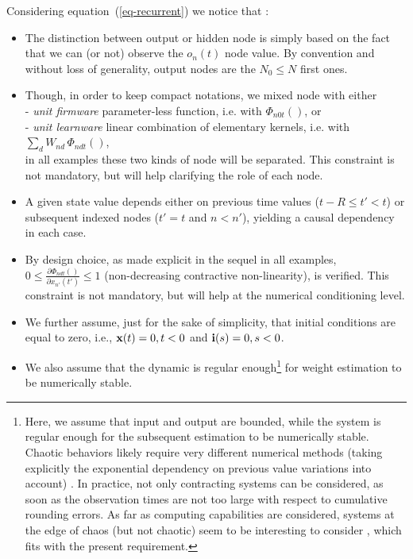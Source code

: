 Considering equation~(\ref{eq-recurrent}) we notice that : \begin{itemize}

\item The distinction between output or hidden node is simply based on the fact that we can (or not) observe the $o_n(t)$ node value. By convention and without loss of generality, output nodes are the $N_0 \leq N$ first ones.

\item Though, in order to keep compact notations, we mixed node with either 
 \\ \hphantom{0.2cm} - {\em unit firmware} parameter-less function, i.e. with $\Phi_{n0t}()$, or
 \\ \hphantom{0.2cm} - {\em unit learnware} linear combination of elementary kernels, i.e. with $\sum_{d} W_{nd} \, \Phi_{ndt}()$,
\\ in all examples these two kinds of node will be separated. This constraint is not mandatory, but will help clarifying the role of each node.

\item A given state value depends either on previous time values ($t - R \leq t' < t$) or subsequent indexed nodes ($t' = t$ and $n < n'$), yielding a causal dependency in each case.

\item By design choice, as made explicit in the sequel in all examples, $0 \leq \frac{\partial \Phi_{ndt}()}{\partial x_{n'}(t')} \leq 1$ (non-decreasing contractive non-linearity), is verified. This constraint is not mandatory, but will help at the numerical conditioning level.

\item We further assume, just for the sake of simplicity, that initial conditions are equal to zero, i.e., ${\bf x}(t) = 0, t < 0$ and ${\bf i}(s) = 0, s < 0$. 

\item We also assume that the dynamic is regular enough\footnote{Here, we assume that input and output are bounded, while the system is regular enough for the subsequent estimation to be numerically stable. Chaotic behaviors likely require very different numerical methods (taking explicitly the exponential dependency on previous value variations into account) \cite{cessac_view_2010}. In practice, not only contracting systems can be considered, as soon as the observation times are not too large with respect to cumulative rounding errors. As far as computing capabilities are considered, systems at the edge of chaos (but not chaotic) seem to be interesting to consider \cite{bertschinger-natschlager:04,Legenstein:2007}, which fits with the present requirement.} for weight estimation to be numerically stable.

\end{itemize}

